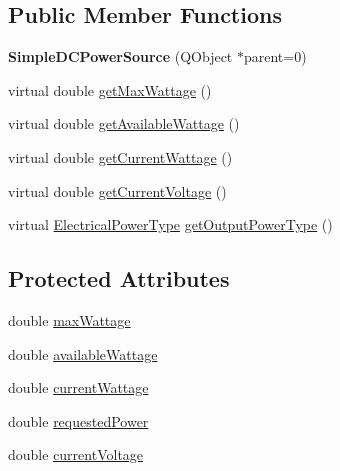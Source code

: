 \subsection*{Public Member Functions}
\begin{DoxyCompactItemize}
\item 
\hypertarget{class_challenger604_systems_1_1_simple_d_c_power_source_a874e451053b69d48b2bbdf924ce05dde}{{\bfseries Simple\-D\-C\-Power\-Source} (Q\-Object $\ast$parent=0)}\label{class_challenger604_systems_1_1_simple_d_c_power_source_a874e451053b69d48b2bbdf924ce05dde}

\item 
virtual double \hyperlink{class_challenger604_systems_1_1_simple_d_c_power_source_ad6285e377af915c21bf15637732f0291}{get\-Max\-Wattage} ()
\item 
virtual double \hyperlink{class_challenger604_systems_1_1_simple_d_c_power_source_a47085e7418e1e327552bd4339d08621a}{get\-Available\-Wattage} ()
\item 
virtual double \hyperlink{class_challenger604_systems_1_1_simple_d_c_power_source_ac1f53b3d602f8279f3b80bf9280b62d9}{get\-Current\-Wattage} ()
\item 
virtual double \hyperlink{class_challenger604_systems_1_1_simple_d_c_power_source_a19a6be7acae4e8183a0b03f0e948f659}{get\-Current\-Voltage} ()
\item 
virtual \hyperlink{namespace_challenger604_systems_a9ad1a793d94b97514092692cb7315afd}{Electrical\-Power\-Type} \hyperlink{class_challenger604_systems_1_1_simple_d_c_power_source_a9253b83cb9e35b40db473e24bf3d7f54}{get\-Output\-Power\-Type} ()
\end{DoxyCompactItemize}
\subsection*{Protected Attributes}
\begin{DoxyCompactItemize}
\item 
double \hyperlink{class_challenger604_systems_1_1_simple_d_c_power_source_a7ccc3391b03c04b09f6792e0a44b026b}{max\-Wattage}
\item 
double \hyperlink{class_challenger604_systems_1_1_simple_d_c_power_source_a1e32a5e348dca6e2043f539a434debd9}{available\-Wattage}
\item 
double \hyperlink{class_challenger604_systems_1_1_simple_d_c_power_source_a5c8c5b89f6d3cd3d332ee12ef893839c}{current\-Wattage}
\item 
double \hyperlink{class_challenger604_systems_1_1_simple_d_c_power_source_a37f983774689318c3cb0295380ce4bd7}{requested\-Power}
\item 
double \hyperlink{class_challenger604_systems_1_1_simple_d_c_power_source_a6d5b229b66f1e6396229561e9a9562e4}{current\-Voltage}
\end{DoxyCompactItemize}


